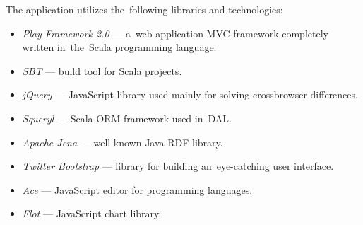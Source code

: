 The application utilizes the~following libraries and technologies:
\begin{itemize}
  \item \emph{Play Framework 2.0} --- a~web application MVC framework completely written 
  in~the~Scala programming language.
  \item \emph{SBT} --- build tool for Scala projects.
  \item \emph{jQuery} --- JavaScript library used mainly for solving crossbrowser 
  differences.
  \item \emph{Squeryl} --- Scala ORM framework used in~DAL.
  \item \emph{Apache Jena} --- well known Java RDF library.
  \item \emph{Twitter Bootstrap} --- library for building an~eye-catching user 
  interface.
  \item \emph{Ace} --- JavaScript editor for programming languages.
  \item \emph{Flot} --- JavaScript chart library.
\end{itemize}

